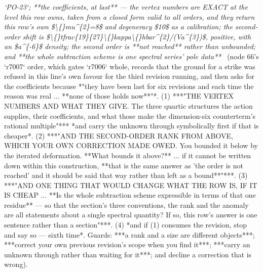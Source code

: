 \begin{description}
\textit{`PO-23`; **the coefficients, at last** --- the vertex numbers are EXACT at the level this row owns, taken from a closed form valid to all orders, and they return this row's own \$\textbackslash\{\}mu\textasciicircum{}\{2\}=8\$ and degeneracy \$10\$ as a calibration; the second-order shift is \$\textbackslash\{\}tfrac\{19\}\{27\}\textbackslash\{\}kappa\textbackslash\{\}hbar\textasciicircum{}\{2\}/(Va\textasciicircum{}\{3\})\$, positive, with an \$a\textasciicircum{}\{-6\}\$ density; the second order is **not reached** rather than unbounded; and **the whole subtraction scheme is one spectral series' pole data**} \ (node 66's `r7007` order, which gates `r7006` whole, records that the ground for a strike was refused in this line's own favour for the third revision running, and then asks for the coefficients because *"they have been last for six revisions and each time the reason was real ... **none of those holds now**"*. (1) ***"THE VERTEX NUMBERS AND WHAT THEY GIVE.  The three quartic structures the action supplies, their coefficients, and what those make the dimension-six counterterm's rational multiple"***  *and carry the unknown through symbolically first if that is cheaper*. (2) ***"AND THE SECOND-ORDER RANK FROM ABOVE, WHICH YOUR OWN CORRECTION MADE OWED.  You bounded it below by the iterated deformation.  **What bounds it above?** ... if it cannot be written down within this construction, **that is the same answer as 'the order is not reached' and it should be said that way rather than left as a bound**"***. (3) ***"AND ONE THING THAT WOULD CHANGE WHAT THE ROW IS, IF IT IS CHEAP ... **Is the whole subtraction scheme expressible in terms of that one residue** --- so that the section's three conventions, the rank and the anomaly are all statements about a single spectral quantity?  If so, this row's answer is one sentence rather than a section"***. (4) *and if (1) consumes the revision, stop and say so --- sixth time*.  Guards: ***a rank and a size are different objects***; ***correct your own previous revision's scope when you find it***; ***carry an unknown through rather than waiting for it***; and decline a correction that is wrong). 

\end{description}
